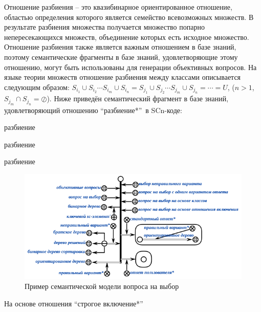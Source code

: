 \begin{textitemize}
\begin{textitemize}
		Отношение разбиения – это квазибинарное ориентированное отношение, областью определения которого является семейство всевозможных множеств. В  результате разбиения множества получается множество попарно непересекающихся множеств, объединение которых есть исходное множество. Отношение разбиения также является важным отношением в базе знаний, поэтому семантические фрагменты в базе знаний, удовлетворяющие этому отношению, могут быть использованы для генерации объективных вопросов. На языке теории множеств отношение разбиения между классами описывается следующим образом: $S_{i_{1}}\cup  S_{i_{2}}\cdots S_{i_{m}} \cup S_{i_{n}} = S_{j_{1}}\cup  S_{j_{2}}\cdots S_{j_{m}} \cup S_{j_{n}}= \cdots = U$, ($n>1$, $S_{j_{m}} \cap S_{j_{n}} = \oslash$). Ниже приведён семантический фрагмент в базе знаний, удовлетворяющий отношению ``разбиение*''\ в SCn-коде:
		\begin{SCn}
			\begin{scnrelfromset}{разбиение}
			\end{scnrelfromset}
			\begin{scnrelfromset}{разбиение}
			\end{scnrelfromset}
			\begin{scnrelfromset}{разбиение}
			\end{scnrelfromset}
		\end{SCn}
		\begin{figure}[H]
			\includegraphics[scale=1]{author/part7/figures/MC_question_example.png}
			\caption{Пример семантической модели вопроса на выбор}
			\label{fig:mc_example}
		\end{figure}
		
		\item На основе отношения ``строгое включение*''
		

\end{textitemize}
\end{textitemize}
